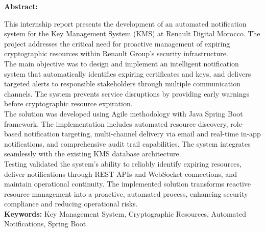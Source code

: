 \vspace*{1cm}
\begin{center}
    \textbf{\huge{Abstract:}}
\end{center}
\vspace{1cm}

\begin{doublespace}
This internship report presents the development of an automated notification system for the Key Management System (KMS) at Renault Digital Morocco. The project addresses the critical need for proactive management of expiring cryptographic resources within Renault Group's security infrastructure.\\

The main objective was to design and implement an intelligent notification system that automatically identifies expiring certificates and keys, and delivers targeted alerts to responsible stakeholders through multiple communication channels. The system prevents service disruptions by providing early warnings before cryptographic resource expiration.\\

The solution was developed using Agile methodology with Java Spring Boot framework. The implementation includes automated resource discovery, role-based notification targeting, multi-channel delivery via email and real-time in-app notifications, and comprehensive audit trail capabilities. The system integrates seamlessly with the existing KMS database architecture.\\

Testing validated the system's ability to reliably identify expiring resources, deliver notifications through REST APIs and WebSocket connections, and maintain operational continuity. The implemented solution transforms reactive resource management into a proactive, automated process, enhancing security compliance and reducing operational risks.\\

\noindent
\textbf{Keywords:} Key Management System, Cryptographic Resources, Automated Notifications, Spring Boot
\end{doublespace}